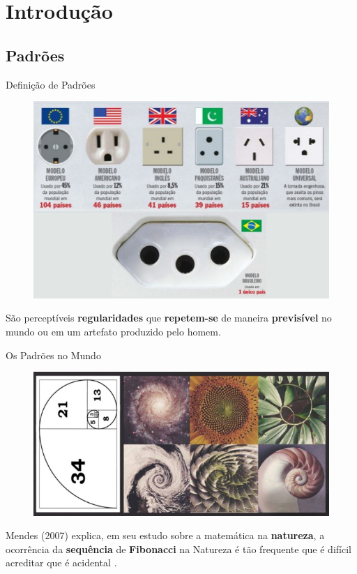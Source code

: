 \section{Introdução}

\subsection{Padrões}
    \begin{frame}[fragile]{Definição de Padrões}
        \begin{figure}[H]
        \begin{center}
            \includegraphics[scale=0.50]{images/padroes.png}
        \end{center}
        \end{figure}

        São perceptíveis \textbf{regularidades} que \textbf{repetem-se} de
        maneira \textbf{previsível} no mundo ou em um artefato produzido pelo
        homem.
    \end{frame}

    \begin{frame}[fragile]{Os Padrões no Mundo}
        \begin{figure}[H]
        \begin{center}
            \includegraphics[scale=0.60]{images/padroes_mundo.png}
        \end{center}
        \end{figure}

        Mendes (2007) explica, em seu estudo sobre a matemática na
        \textbf{natureza}, a ocorrência da \textbf{sequência} de
        \textbf{Fibonacci} na Natureza é tão frequente que é difícil acreditar
        que é acidental \cite{mendes2007matematica}.
    \end{frame}

